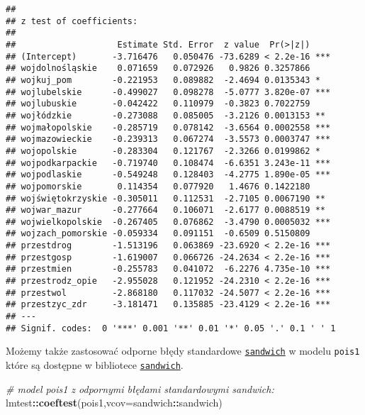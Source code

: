 \documentclass[polish,]{book}
\newenvironment{Shaded}{\begin{snugshade}}{\end{snugshade}}
\newcommand{\CommentTok}[1]{\textcolor[rgb]{0.56,0.35,0.01}{\textit{#1}}}
\newcommand{\DataTypeTok}[1]{\textcolor[rgb]{0.13,0.29,0.53}{#1}}
\newcommand{\KeywordTok}[1]{\textcolor[rgb]{0.13,0.29,0.53}{\textbf{#1}}}
\newcommand{\NormalTok}[1]{#1}
\newcommand{\OperatorTok}[1]{\textcolor[rgb]{0.81,0.36,0.00}{\textbf{#1}}}
\begin{document}
\begin{verbatim}
## 
## z test of coefficients:
## 
##                    Estimate Std. Error  z value  Pr(>|z|)    
## (Intercept)       -3.716476   0.050476 -73.6289 < 2.2e-16 ***
## wojdolnośląskie    0.071659   0.072926   0.9826 0.3257866    
## wojkuj_pom        -0.221953   0.089882  -2.4694 0.0135343 *  
## wojlubelskie      -0.499027   0.098278  -5.0777 3.820e-07 ***
## wojlubuskie       -0.042422   0.110979  -0.3823 0.7022759    
## wojłódzkie        -0.273088   0.085005  -3.2126 0.0013153 ** 
## wojmałopolskie    -0.285719   0.078142  -3.6564 0.0002558 ***
## wojmazowieckie    -0.239313   0.067274  -3.5573 0.0003747 ***
## wojopolskie       -0.283304   0.121767  -2.3266 0.0199862 *  
## wojpodkarpackie   -0.719740   0.108474  -6.6351 3.243e-11 ***
## wojpodlaskie      -0.549248   0.128403  -4.2775 1.890e-05 ***
## wojpomorskie       0.114354   0.077920   1.4676 0.1422180    
## wojświętokrzyskie -0.305011   0.112531  -2.7105 0.0067190 ** 
## wojwar_mazur      -0.277664   0.106071  -2.6177 0.0088519 ** 
## wojwielkopolskie  -0.267405   0.076862  -3.4790 0.0005032 ***
## wojzach_pomorskie -0.059334   0.091151  -0.6509 0.5150809    
## przestdrog        -1.513196   0.063869 -23.6920 < 2.2e-16 ***
## przestgosp        -1.619007   0.066726 -24.2634 < 2.2e-16 ***
## przestmien        -0.255783   0.041072  -6.2276 4.735e-10 ***
## przestrodz_opie   -2.955028   0.121952 -24.2310 < 2.2e-16 ***
## przestwol         -2.868180   0.117032 -24.5077 < 2.2e-16 ***
## przestzyc_zdr     -3.181471   0.135885 -23.4129 < 2.2e-16 ***
## ---
## Signif. codes:  0 '***' 0.001 '**' 0.01 '*' 0.05 '.' 0.1 ' ' 1
\end{verbatim}

Możemy także zastosować odporne błędy standardowe \href{https://rdrr.io/cran/sandwich/man/sandwich.html}{\texttt{sandwich}} w modelu \texttt{pois1}
które są dostępne w bibliotece \href{https://rdrr.io/cran/sandwich/man/}{\texttt{sandwich}}.

\begin{Shaded}
\begin{Highlighting}[]
\CommentTok{# model pois1 z odpornymi błędami standardowymi sandwich:}
\NormalTok{lmtest}\OperatorTok{::}\KeywordTok{coeftest}\NormalTok{(pois1,}\DataTypeTok{vcov=}\NormalTok{sandwich}\OperatorTok{::}\NormalTok{sandwich)}
\end{Highlighting}
\end{Shaded}
\end{document}

